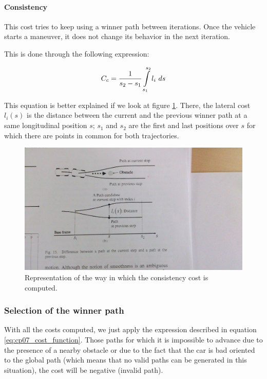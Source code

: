 \paragraph{Consistency}\label{ch:chapter07_01_04_00_05}

This cost tries to keep using a winner path between iterations. Once the vehicle starts a maneuver, it does not change its behavior in the next iteration.

This is done through the following expression:

\begin{equation}\label{eq:cp07_consistency_cost}
C_c = {1 \over {s_2 - s_1}} \int \limits_{s_1}^{s_2} l_i ~ ds
\end{equation}

This equation is better explained if we look at figure \ref{fig:cp07_consistency_cost}. There, the lateral cost $l_i(s)$ is the distance between the current and the previous winner path at a same longitudinal position $s$; $s_1$ and $s_2$ are the first and last positions over $s$ for which there are points in common for both trajectories.

\begin{figure}[h!]
  \centering
  \includegraphics{consistency_cost}
  \caption{Representation of the way in which the consistency cost is computed.}\label{fig:cp07_consistency_cost}
\end{figure}

\subsubsection{Selection of the winner path}\label{ch:chapter07_01_04_01}

With all the costs computed, we just apply the expression described in equation \ref{eq:cp07_cost_function}. Those paths for which it is impossible to advance due to the presence of a nearby obstacle or due to the fact that the car is bad oriented to the global path (which means that no valid paths can be generated in this situation), the cost will be negative (invalid path).

